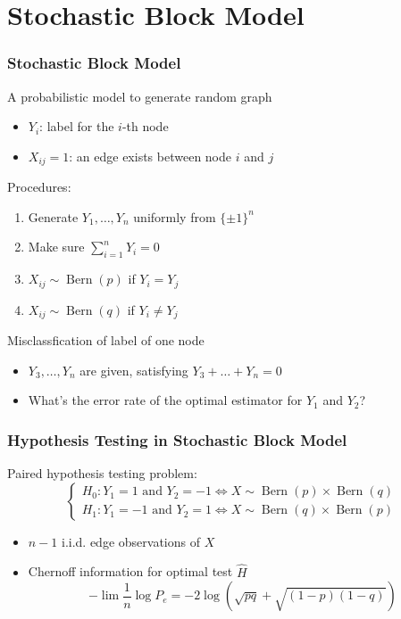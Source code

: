 \documentclass{beamer}
\DeclareMathOperator{\Bern}{Bern}
\begin{document}
\section{Stochastic Block Model}
\begin{frame}
\frametitle{
Stochastic Block Model} A probabilistic model to generate random graph
\begin{itemize}
\item $Y_i$: label for the $i$-th node
\item $X_{ij}=1$: an edge exists between node $i$ and $j$
\end{itemize}
Procedures:
\begin{enumerate}
\item Generate $Y_1, \dots, Y_n$ uniformly from $\{\pm 1\}^n$
\item Make sure $\sum_{i=1}^n Y_i = 0$
\item $X_{ij} \sim \Bern(p) $ if $Y_i=Y_j$
\item $X_{ij} \sim \Bern(q) $ if $Y_i \neq Y_j$
\end{enumerate}
Misclassfication of label of one node
\begin{itemize}
\item $Y_3, \dots, Y_n$ are given, satisfying $Y_3 + \dots + Y_n  = 0$
\item What's the error rate of the optimal estimator for $Y_1$ and $Y_2$?
\end{itemize}
\end{frame}
\begin{frame}
\frametitle{
Hypothesis Testing in Stochastic Block Model} 
Paired hypothesis testing problem:
\begin{equation*}
\begin{cases}
H_0: Y_1 = 1 \textrm{ and } Y_2 = -1 \iff X \sim \Bern(p) \times \Bern(q)\\
H_1: Y_1 = -1 \textrm{ and } Y_2 = 1 \iff X \sim \Bern(q) \times \Bern(p)
\end{cases}
\end{equation*}
\begin{itemize}
\item $n-1$ i.i.d. edge observations of $X$
\item Chernoff information for optimal test $\widehat{H}$
\begin{equation*}
-\lim \frac{1}{n}\log P_e = -2 \log (\sqrt{pq}+\sqrt{(1-p)(1-q)})
\end{equation*}
\end{itemize}
\end{frame}
\end{document}
